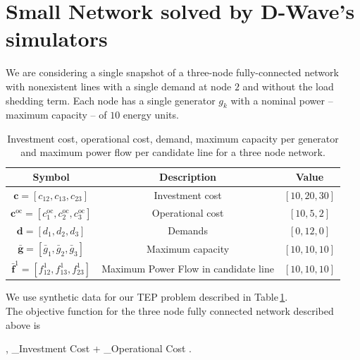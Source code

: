 \section{Small Network solved by D-Wave's simulators}
 We are considering a single snapshot of a three-node fully-connected network with nonexistent lines with a single demand at node $2$ and without the load shedding term. Each node has a single generator $g_{k}$ with a nominal power -- maximum capacity -- of $10$ energy units.
 \begin{table}[H]
\centering
\begin{tabular}{ |c |c| c| }
  \hline			
  \textbf{Symbol} & \textbf{Description} & \textbf{Value}  \\
    \hline		
   $\mathbf{c} = \left[c_{12},c_{13},c_{23}\right]$ & Investment cost & $\left[10, 20, 30\right]$\\
       \hline		
   $\mathbf{c}^{\textrm{oc}} = \left[c_{1}^{\textrm{oc}},c_{2}^{\textrm{oc}}, c_{3}^{\textrm{oc}}\right]$ & Operational cost & $\left[10, 5, 2\right]$\\
          \hline		
   $\mathbf{d} = \left[d_{1}, d_{2}, d_{3}\right]$ & Demands & $\left[0, 12, 0\right]$\\
       \hline		
   $\mathbf{\bar{g}} = \left[\bar{g}_{1},\bar{g}_{2},\bar{g}_{3}\right]$ & Maximum capacity & $\left[10, 10, 10\right]$\\
    \hline	
    $\mathbf{\bar{f}}^{1} = \left[f_{12}^{1},f_{13}^{1},f_{23}^{1}\right]$ & Maximum Power Flow in candidate line & $\left[10, 10, 10\right]$\\
    \hline
\end{tabular}
\caption{Investment cost, operational cost, demand, maximum capacity per generator and maximum power flow per candidate line for a three node network.}
\label{tab:SmallNetwork}
\end{table}
We use synthetic data for our TEP problem described in Table\,\ref{tab:SmallNetwork}.\\
The objective function for the three node fully connected network described above is
\begin{mini!}[2]
	{, }{_{\textrm{Investment Cost}} + _{\textrm{Operational Cost}}}{}{}{}
    .
    \end{mini!}
